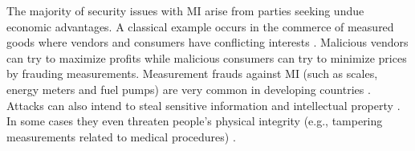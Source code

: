\documentclass[journal]{IEEEtran}
\begin{document}
The majority of security issues with MI arise from parties seeking undue economic advantages.
A classical example occurs in the commerce of measured goods where vendors and consumers have conflicting interests \cite{RodriguesFilho2015}.
Malicious vendors can try to maximize profits while malicious consumers can try to minimize prices by frauding measurements.
Measurement frauds against MI (such as scales, energy meters and fuel pumps) are very common in developing countries \cite{Camara2012,Luchsinger2008}.
Attacks can also intend to steal sensitive information and intellectual property \cite{Camara2012,Oppermann2018}.
In some cases they even threaten people's physical integrity (e.g., tampering measurements related to medical procedures) \cite{Boccardo2014}.
\end{document}
